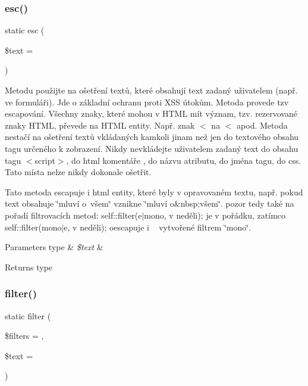 \subsubsection{\texorpdfstring{esc()}{esc()}}
{\footnotesize\ttfamily static esc (\begin{DoxyParamCaption}\item[{}]{\$text = {\ttfamily \textquotesingle{}\textquotesingle{}} }\end{DoxyParamCaption})\hspace{0.3cm}{\ttfamily [static]}}

Metodu použijte na ošetření textů, které obsahují text zadaný uživatelem (např. ve formuláři). Jde o základní ochranu proti X\+SS útokům. Metoda provede tzv escapování. Všechny znaky, které mohou v H\+T\+ML mít význam, tzv. rezervované znaky H\+T\+ML, převede na H\+T\+ML entity. Např. znak $<$ na $<$ apod. Metoda nestačí na ošetření textů vkládaných kamkoli jinam než jen do textového obsahu tagu určeného k zobrazení. Nikdy nevkládejte uživatelem zadaný text do obsahu tagu $<$script$>$, do html komentáře , do názvu atributu, do jména tagu, do css. Tato místa nelze nikdy dokonale ošetřit.

Tato metoda escapuje i html entity, které byly v opravovaném textu, např. pokud text obsahuje \char`\"{}mluví o~všem\char`\"{} vznikne \char`\"{}mluví o\&nbsp;všem\char`\"{}. pozor tedy také na pořadí filtrovacích metod\+: self\+::filter(\textquotesingle{}e$\vert$mono\textquotesingle{}, \textquotesingle{}v neděli\textquotesingle{}); je v pořádku, zatímco self\+::filter(\textquotesingle{}mono$\vert$e\textquotesingle{}, \textquotesingle{}v neděli\textquotesingle{}); oescapuje i ~ vytvořené filtrem \char`\"{}mono\char`\"{}.


\begin{DoxyParams}[1]{Parameters}
type & {\em \$text} & \\
\hline
\end{DoxyParams}
\begin{DoxyReturn}{Returns}
type 
\end{DoxyReturn}
\mbox{\label{class_pes_1_1_text_1_1_html_a6901ad57f053e0db94de132286ea8b29}} 
\subsubsection{\texorpdfstring{filter()}{filter()}}
{\footnotesize\ttfamily static filter (\begin{DoxyParamCaption}\item[{}]{\$filters = {\ttfamily \textquotesingle{}\textquotesingle{}},  }\item[{}]{\$text = {\ttfamily \textquotesingle{}\textquotesingle{}} }\end{DoxyParamCaption})\hspace{0.3cm}{\ttfamily [static]}}

